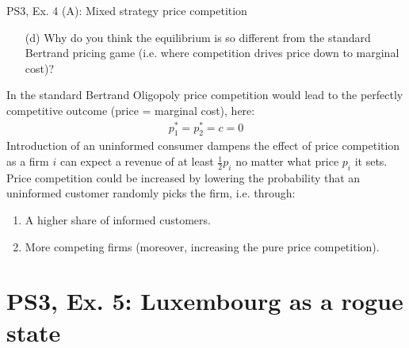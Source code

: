 \begin{frame}{PS3, Ex. 4 (A): Mixed strategy price competition}
    \begin{itemize}
      \item[(d)] Why do you think the equilibrium is so different from the standard Bertrand pricing game (i.e. where competition drives price down to marginal cost)?
    \end{itemize}
    In the standard Bertrand Oligopoly price competition would lead to the perfectly competitive outcome (price = marginal cost), here:
    \begin{align*}
      p_1^{*}=p_2^{*}=c=0
    \end{align*}
    Introduction of an uninformed consumer dampens the effect of price competition as a firm $i$ can expect a revenue of at least $\frac{1}{2}p_i$ no matter what price $p_i$ it sets.\\\medskip
    Price competition could be increased by lowering the probability that an uninformed customer randomly picks the firm, i.e. through:
    \begin{enumerate}
      \item A higher share of informed customers.
      \item More competing firms (moreover, increasing the pure price competition).
    \end{enumerate}
  \vfill\null
\end{frame}


\section{PS3, Ex. 5: Luxembourg as a rogue state}

